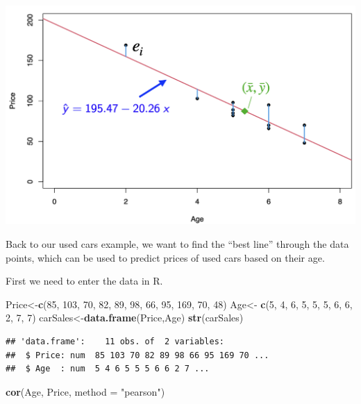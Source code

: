 \documentclass[
]{article}
\newenvironment{Shaded}{\begin{snugshade}}{\end{snugshade}}
\newcommand{\AttributeTok}[1]{\textcolor[rgb]{0.13,0.29,0.53}{#1}}
\newcommand{\DecValTok}[1]{\textcolor[rgb]{0.00,0.00,0.81}{#1}}
\newcommand{\FunctionTok}[1]{\textcolor[rgb]{0.13,0.29,0.53}{\textbf{#1}}}
\newcommand{\NormalTok}[1]{#1}
\newcommand{\OtherTok}[1]{\textcolor[rgb]{0.56,0.35,0.01}{#1}}
\newcommand{\StringTok}[1]{\textcolor[rgb]{0.31,0.60,0.02}{#1}}
\begin{document}
\begin{center}\includegraphics[width=0.6\linewidth,height=0.6\textheight]{figures/leastsq5} \end{center}

Back to our used cars example, we want to find the ``best line'' through
the data points, which can be used to predict prices of used cars based
on their age.

First we need to enter the data in R.

\begin{Shaded}
\begin{Highlighting}[]
\NormalTok{Price}\OtherTok{\textless{}{-}}\FunctionTok{c}\NormalTok{(}\DecValTok{85}\NormalTok{, }\DecValTok{103}\NormalTok{,  }\DecValTok{70}\NormalTok{,  }\DecValTok{82}\NormalTok{,  }\DecValTok{89}\NormalTok{,  }\DecValTok{98}\NormalTok{,  }\DecValTok{66}\NormalTok{,  }\DecValTok{95}\NormalTok{, }\DecValTok{169}\NormalTok{,  }\DecValTok{70}\NormalTok{,  }\DecValTok{48}\NormalTok{)}
\NormalTok{Age}\OtherTok{\textless{}{-}} \FunctionTok{c}\NormalTok{(}\DecValTok{5}\NormalTok{, }\DecValTok{4}\NormalTok{, }\DecValTok{6}\NormalTok{, }\DecValTok{5}\NormalTok{, }\DecValTok{5}\NormalTok{, }\DecValTok{5}\NormalTok{, }\DecValTok{6}\NormalTok{, }\DecValTok{6}\NormalTok{, }\DecValTok{2}\NormalTok{, }\DecValTok{7}\NormalTok{, }\DecValTok{7}\NormalTok{)}
\NormalTok{carSales}\OtherTok{\textless{}{-}}\FunctionTok{data.frame}\NormalTok{(Price,Age)}
\FunctionTok{str}\NormalTok{(carSales)}
\end{Highlighting}
\end{Shaded}

\begin{verbatim}
## 'data.frame':    11 obs. of  2 variables:
##  $ Price: num  85 103 70 82 89 98 66 95 169 70 ...
##  $ Age  : num  5 4 6 5 5 5 6 6 2 7 ...
\end{verbatim}

\begin{Shaded}
\begin{Highlighting}[]
\FunctionTok{cor}\NormalTok{(Age, Price, }\AttributeTok{method =} \StringTok{"pearson"}\NormalTok{)}
\end{Highlighting}
\end{Shaded}
\end{document}
